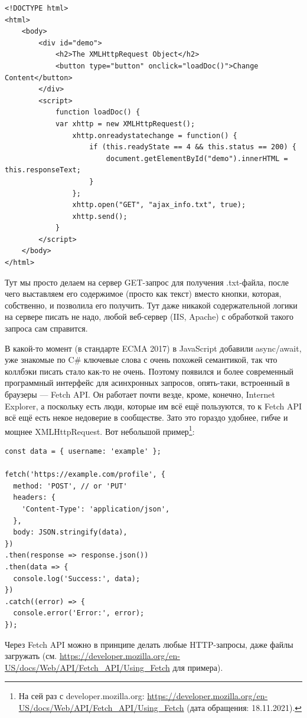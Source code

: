 \documentclass[a5paper]{article}
\begin{document}
\begin{verbatim}
<!DOCTYPE html>
<html>
    <body>
        <div id="demo">
            <h2>The XMLHttpRequest Object</h2>
            <button type="button" onclick="loadDoc()">Change Content</button>
        </div>
        <script>
            function loadDoc() {
            var xhttp = new XMLHttpRequest();
                xhttp.onreadystatechange = function() {
                    if (this.readyState == 4 && this.status == 200) {
                        document.getElementById("demo").innerHTML = this.responseText;
                    }
                };
                xhttp.open("GET", "ajax_info.txt", true);
                xhttp.send();
            }
        </script>
    </body>
</html>
\end{verbatim}

Тут мы просто делаем на сервер GET-запрос для получения .txt-файла, после чего выставляем его содержимое (просто как текст) вместо кнопки, которая, собственно, и позволила его получить. Тут даже никакой содержательной логики на сервере писать не надо, любой веб-сервер (IIS, Apache) с обработкой такого запроса сам справится.

В какой-то момент (в стандарте ECMA 2017) в JavaScript добавили async/await, уже знакомые по C\# ключевые слова с очень похожей семантикой, так что коллбэки писать стало как-то не очень. Поэтому появился и более современный программный интерфейс для асинхронных запросов, опять-таки, встроенный в браузеры --- Fetch API. Он работает почти везде, кроме, конечно, Internet Explorer, а поскольку есть люди, которые им всё ещё пользуются, то к Fetch API всё ещё есть некое недоверие в сообществе. Зато это гораздо удобнее, гибче и мощнее XMLHttpRequest. Вот небольшой пример\footnote{На сей раз с developer.mozilla.org: \url{https://developer.mozilla.org/en-US/docs/Web/API/Fetch_API/Using_Fetch} (дата обращения: 18.11.2021).}:

\begin{verbatim}
const data = { username: 'example' };

fetch('https://example.com/profile', {
  method: 'POST', // or 'PUT'
  headers: {
    'Content-Type': 'application/json',
  },
  body: JSON.stringify(data),
})
.then(response => response.json())
.then(data => {
  console.log('Success:', data);
})
.catch((error) => {
  console.error('Error:', error);
});
\end{verbatim}

Через Fetch API можно в принципе делать любые HTTP-запросы, даже файлы загружать (см. \url{https://developer.mozilla.org/en-US/docs/Web/API/Fetch_API/Using_Fetch} для примера).
\end{document}
